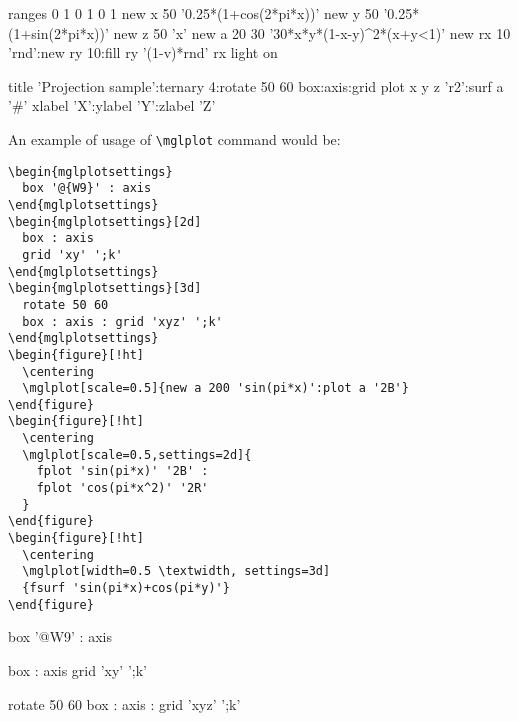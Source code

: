 \documentclass[12pt]{article}
\begin{document}
\begin{mglverbatim}
  ranges 0 1 0 1 0 1
  new x 50 '0.25*(1+cos(2*pi*x))'
  new y 50 '0.25*(1+sin(2*pi*x))'
  new z 50 'x'
  new a 20 30 '30*x*y*(1-x-y)^2*(x+y<1)'
  new rx 10 'rnd':new ry 10:fill ry '(1-v)*rnd' rx
  light on
  
  title 'Projection sample':ternary 4:rotate 50 60
  box:axis:grid
  plot x y z 'r2':surf a '#'
  xlabel 'X':ylabel 'Y':zlabel 'Z'
\end{mglverbatim}


An example of usage of \texttt{\textbackslash{}mglplot} command would be:
\begin{verbatim}
\begin{mglplotsettings}
  box '@{W9}' : axis
\end{mglplotsettings}
\begin{mglplotsettings}[2d]
  box : axis
  grid 'xy' ';k'
\end{mglplotsettings}
\begin{mglplotsettings}[3d]
  rotate 50 60
  box : axis : grid 'xyz' ';k'
\end{mglplotsettings}
\begin{figure}[!ht]
  \centering
  \mglplot[scale=0.5]{new a 200 'sin(pi*x)':plot a '2B'}
\end{figure}
\begin{figure}[!ht]
  \centering
  \mglplot[scale=0.5,settings=2d]{
    fplot 'sin(pi*x)' '2B' :
    fplot 'cos(pi*x^2)' '2R'
  }
\end{figure}
\begin{figure}[!ht]
  \centering
  \mglplot[width=0.5 \textwidth, settings=3d]
  {fsurf 'sin(pi*x)+cos(pi*y)'}
\end{figure}
\end{verbatim}

\begin{mglplotsettings}
  box '@{W9}' : axis
\end{mglplotsettings}
\begin{mglplotsettings}[2d]
  box : axis
  grid 'xy' ';k'
\end{mglplotsettings}
\begin{mglplotsettings}[3d]
  rotate 50 60
  box : axis : grid 'xyz' ';k'
\end{mglplotsettings}
\begin{figure}[!ht]
  \centering
\end{figure}
\begin{figure}[!ht]
  \centering
\end{figure}
\begin{figure}[!ht]
  \centering
\end{figure}
\end{document}
